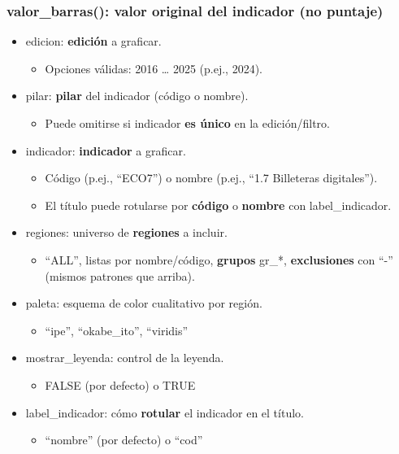 \documentclass[
  11pt,
  letterpaper,
  DIV=11,
  numbers=noendperiod]{scrartcl}
\providecommand{\tightlist}{%
  \setlength{\itemsep}{0pt}\setlength{\parskip}{0pt}}\usepackage{longtable,booktabs,array}
\begin{document}
\subsubsection{\texorpdfstring{\textbf{valor\_barras(): valor original
del indicador (no
puntaje)}}{valor\_barras(): valor original del indicador (no puntaje)}}\label{valor_barras-valor-original-del-indicador-no-puntaje}

\begin{itemize}
\item
  edicion: \textbf{edición} a graficar.

  \begin{itemize}
  \tightlist
  \item
    Opciones válidas: 2016 \ldots{} 2025 (p.ej., 2024).
  \end{itemize}
\item
  pilar: \textbf{pilar} del indicador (código o nombre).

  \begin{itemize}
  \tightlist
  \item
    Puede omitirse si indicador \textbf{es único} en la edición/filtro.
  \end{itemize}
\item
  indicador: \textbf{indicador} a graficar.

  \begin{itemize}
  \item
    Código (p.ej., ``ECO7'') o nombre (p.ej., ``1.7 Billeteras
    digitales'').
  \item
    El título puede rotularse por \textbf{código} o \textbf{nombre} con
    label\_indicador.
  \end{itemize}
\item
  regiones: universo de \textbf{regiones} a incluir.

  \begin{itemize}
  \tightlist
  \item
    ``ALL'', listas por nombre/código, \textbf{grupos} gr\_*,
    \textbf{exclusiones} con ``-'' (mismos patrones que arriba).
  \end{itemize}
\item
  paleta: esquema de color cualitativo por región.

  \begin{itemize}
  \tightlist
  \item
    ``ipe'', ``okabe\_ito'', ``viridis''
  \end{itemize}
\item
  mostrar\_leyenda: control de la leyenda.

  \begin{itemize}
  \tightlist
  \item
    FALSE (por defecto) o TRUE
  \end{itemize}
\item
  label\_indicador: cómo \textbf{rotular} el indicador en el título.

  \begin{itemize}
  \tightlist
  \item
    ``nombre'' (por defecto) o ``cod''
  \end{itemize}
\end{itemize}
\end{document}
